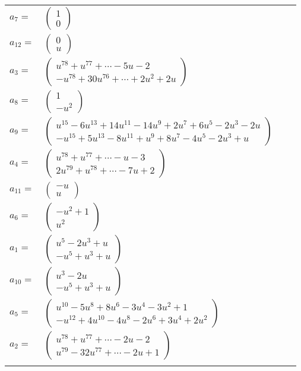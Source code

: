 \documentclass[1p]{elsarticle_modified}
\theoremstyle{definition}
\begin{document}
\begin{tabular}{m{7pt} m{180pt} m{7pt} m{180pt} }
\flushright $a_{7}=$&$\begin{pmatrix}1\\0\end{pmatrix}$ \\
\flushright $a_{12}=$&$\begin{pmatrix}0\\u\end{pmatrix}$ \\
\flushright $a_{3}=$&$\begin{pmatrix}u^{78}+u^{77}+\cdots-5 u-2\\- u^{78}+30 u^{76}+\cdots+2 u^2+2 u\end{pmatrix}$ \\
\flushright $a_{8}=$&$\begin{pmatrix}1\\- u^2\end{pmatrix}$ \\
\flushright $a_{9}=$&$\begin{pmatrix}u^{15}-6 u^{13}+14 u^{11}-14 u^9+2 u^7+6 u^5-2 u^3-2 u\\- u^{15}+5 u^{13}-8 u^{11}+u^9+8 u^7-4 u^5-2 u^3+u\end{pmatrix}$ \\
\flushright $a_{4}=$&$\begin{pmatrix}u^{78}+u^{77}+\cdots- u-3\\2 u^{79}+u^{78}+\cdots-7 u+2\end{pmatrix}$ \\
\flushright $a_{11}=$&$\begin{pmatrix}- u\\u\end{pmatrix}$ \\
\flushright $a_{6}=$&$\begin{pmatrix}- u^2+1\\u^2\end{pmatrix}$ \\
\flushright $a_{1}=$&$\begin{pmatrix}u^5-2 u^3+u\\- u^5+u^3+u\end{pmatrix}$ \\
\flushright $a_{10}=$&$\begin{pmatrix}u^3-2 u\\- u^5+u^3+u\end{pmatrix}$ \\
\flushright $a_{5}=$&$\begin{pmatrix}u^{10}-5 u^8+8 u^6-3 u^4-3 u^2+1\\- u^{12}+4 u^{10}-4 u^8-2 u^6+3 u^4+2 u^2\end{pmatrix}$ \\
\flushright $a_{2}=$&$\begin{pmatrix}u^{78}+u^{77}+\cdots-2 u-2\\u^{79}-32 u^{77}+\cdots-2 u+1\end{pmatrix}$\\&\end{tabular}
\end{document}
